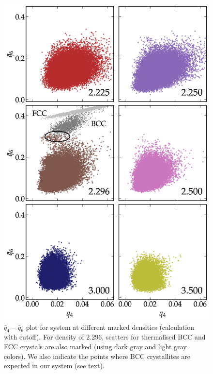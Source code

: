 %
%
\begin{figure}
\centering
\includegraphics[width=13cm]{figs/fig6p4.png}
\caption[{\em Search for crystalline nuclei at different densities using $\bar{q}_4-\bar{q}_6$ analysis }]{$\bar{q}_4-\bar{q}_6$ plot for system at different marked densities (calculation with cutoff). {For density of $2.296$, scatters for thermalised BCC and FCC crystals are also marked (using dark gray and light gray colors). We also indicate the points where BCC crystallites are expected in our system (see text)}.\label{fig6p4}}
\end{figure}
%

